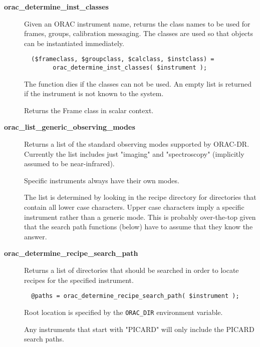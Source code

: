 \begin{description}

\item[{\textbf{orac\_determine\_inst\_classes}}] \mbox{}

Given an ORAC instrument name, returns the class names to be
used for frames, groups, calibration messaging. The classes
are used so that objects can be instantiated immediately.

\begin{verbatim}
  ($frameclass, $groupclass, $calclass, $instclass) =
        orac_determine_inst_classes( $instrument );
\end{verbatim}


The function dies if the classes can not be used.
An empty list is returned if the instrument is not known
to the system.



Returns the Frame class in scalar context.


\item[{\textbf{orac\_list\_generic\_observing\_modes}}] \mbox{}

Returns a list of the standard observing modes supported
by ORAC-DR. Currently the list includes just "imaging"
and "spectroscopy" (implicitly assumed to be near-infrared).



Specific instruments always have their own modes.



The list is determined by looking in the recipe directory for
directories that contain all lower case characters.  Upper case
characters imply a specific instrument rather than a generic
mode. This is probably over-the-top given that the search path
functions (below) have to assume that they know the answer.


\item[{\textbf{orac\_determine\_recipe\_search\_path}}] \mbox{}

Returns a list of directories that should be searched in order
to locate recipes for the specified instrument.

\begin{verbatim}
  @paths = orac_determine_recipe_search_path( $instrument );
\end{verbatim}


Root location is specified by the \texttt{ORAC\_DIR} environment
variable.



Any instruments that start with "PICARD" will only include
the PICARD search paths.



\end{description}
